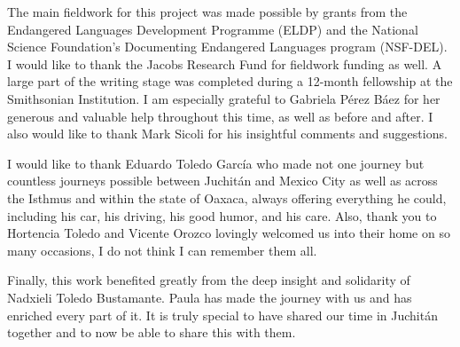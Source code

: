 \begin{refsection}

The main fieldwork for this project was made possible by grants from the Endangered Languages Development Programme (ELDP) and the National Science Foundation's Documenting Endangered Languages program (NSF-DEL). I would like to thank the Jacobs Research Fund for fieldwork funding as well. A large part of the writing stage was completed during a 12-month fellowship at the Smithsonian Institution. I am especially grateful to Gabriela P\'{e}rez B\'{a}ez for her generous and valuable help throughout this time, as well as before and after. I also would like to thank Mark Sicoli for his insightful comments and suggestions.


I would like to thank Eduardo Toledo Garc\'{i}a who made not one journey but countless journeys possible between Juchit\'{a}n and Mexico City as well as across the Isthmus and within the state of Oaxaca, always offering everything he could, including his car, his driving, his good humor, and his care. Also, thank you to Hortencia Toledo and Vicente Orozco lovingly welcomed us into their home on so many occasions, I do not think I can remember them all. 


Finally, this work benefited greatly from the deep insight and solidarity of Nadxieli Toledo Bustamante. Paula has made the journey with us and has enriched every part of it. It is truly special to have shared our time in Juchit\'{a}n together and to now be able to share this with them.

\printbibliography[heading=subbibliography]
\end{refsection}


